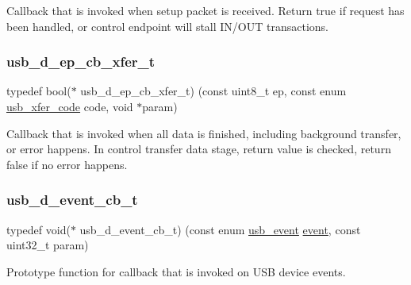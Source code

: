 Callback that is invoked when setup packet is received. Return {\ttfamily true} if request has been handled, or control endpoint will stall I\+N/\+O\+UT transactions. \mbox{\label{group__doc__driver__hal__usb__device_gae62eea86879f5c1995f1ca99f095e7ab}} 
\subsubsection{\texorpdfstring{usb\+\_\+d\+\_\+ep\+\_\+cb\+\_\+xfer\+\_\+t}{usb\_d\_ep\_cb\_xfer\_t}}
{\footnotesize\ttfamily typedef bool($\ast$ usb\+\_\+d\+\_\+ep\+\_\+cb\+\_\+xfer\+\_\+t) (const uint8\+\_\+t ep, const enum \hyperlink{hpl__usb_8h_aade1cf1cf1633cd4c57b2b9d3b410c5e}{usb\+\_\+xfer\+\_\+code} code, void $\ast$param)}

Callback that is invoked when all data is finished, including background transfer, or error happens. In control transfer data stage, return value is checked, return {\ttfamily false} if no error happens. \mbox{\label{group__doc__driver__hal__usb__device_ga4bcb7ee43d9f4fe37c0e5ac05ed083d4}} 
\subsubsection{\texorpdfstring{usb\+\_\+d\+\_\+event\+\_\+cb\+\_\+t}{usb\_d\_event\_cb\_t}}
{\footnotesize\ttfamily typedef void($\ast$ usb\+\_\+d\+\_\+event\+\_\+cb\+\_\+t) (const enum \hyperlink{hpl__usb_8h_ac59f9b94dab75e205ee8e980ee8efc94}{usb\+\_\+event} \hyperlink{structevent}{event}, const uint32\+\_\+t param)}

Prototype function for callback that is invoked on U\+SB device events. \mbox{\label{group__doc__driver__hal__usb__device_gaad808712d16d588e66167b3719c521ec}} 
